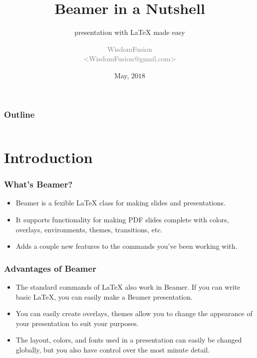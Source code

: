 \documentclass[aspectratio=169,utf8]{ctexbeamer}
\title[Beamer Tutorial]{Beamer in a Nutshell}
\subtitle{presentation with \LaTeX{} made easy}
\author[WisdomFusion]{\scriptsize \textcolor{gray}{WisdomFusion\\ <WisdomFusion@gmail.com>}}
\date{May, $2018$}
\begin{document}
\addtocounter{framenumber}{-1}


\begin{frame}
  \titlepage
\end{frame}

\begin{frame}
  \frametitle{Outline}

  \centering

  \begin{minipage}{.75\textwidth}

    \begin{columns}[t]
      \begin{column}{.5\textwidth}
        \tableofcontents[sections={1-6}]
      \end{column}
      \begin{column}{.5\textwidth}
        \tableofcontents[sections={7-12}]
      \end{column}      
    \end{columns}

  \end{minipage}

\end{frame}


\section{Introduction}

\begin{frame}
  \frametitle{What's Beamer?}

  \begin{itemize}
    \setlength{\itemsep}{8pt}
    \item Beamer is a fexible \LaTeX{} class for making slides and presentations.
    \item It supports functionality for making PDF slides complete with colors, overlays, environments, themes, transitions, etc.
    \item Adds a couple new features to the commands you've been working with.
  \end{itemize}
  
\end{frame}


\begin{frame}
  \frametitle{Advantages of Beamer}

  \begin{itemize}
    \setlength{\itemsep}{8pt}
    \item The standard commands of \LaTeX{} also work in Beamer. If you can write basic \LaTeX{}, you can easily make a Beamer presentation.
    \item You can easily create overlays, themes allow you to change the appearance of your presentation to suit your purposes.
    \item The layout, colors, and fonts used in a presentation can easily be changed globally, but you also have control over the most minute detail.
  \end{itemize}
  
\end{frame}
\end{document}
